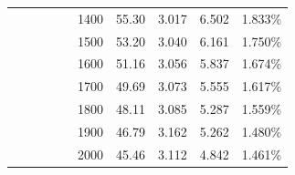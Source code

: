 \documentclass{article}
\begin{document}
\begin{table}[t]
\begin{tabular}{rrrrr|r|r|r|r|r|}
        \cline{6-10}                      &                                      &                            &                             &                           & 1400                    & 55.30                     & 3.017                     & 6.502                     & 1.833\% \bigstrut                   \\
        \cline{6-10}                      &                                      &                            &                             &                           & 1500                    & 53.20                     & 3.040                     & 6.161                     & 1.750\% \bigstrut                   \\
        \cline{6-10}                      &                                      &                            &                             &                           & 1600                    & 51.16                     & 3.056                     & 5.837                     & 1.674\% \bigstrut                   \\
        \cline{6-10}                      &                                      &                            &                             &                           & 1700                    & 49.69                     & 3.073                     & 5.555                     & 1.617\% \bigstrut                   \\
        \cline{6-10}                      &                                      &                            &                             &                           & 1800                    & 48.11                     & 3.085                     & 5.287                     & 1.559\% \bigstrut                   \\
        \cline{6-10}                      &                                      &                            &                             &                           & 1900                    & 46.79                     & 3.162                     & 5.262                     & 1.480\% \bigstrut                   \\
        \cline{6-10}                      &                                      &                            &                             &                           & 2000                    & 45.46                     & 3.112                     & 4.842                     & 1.461\% \bigstrut                   \\
        \cline{6-10}\end{tabular}%
\end{table}%
\end{document}
